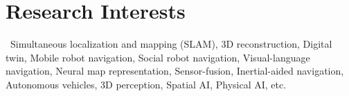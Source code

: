 \section{Research Interests}

\ Simultaneous localization and mapping (SLAM), 3D reconstruction, Digital twin, Mobile robot navigation, Social robot navigation, Visual-language navigation, Neural map representation, Sensor-fusion, Inertial-aided navigation, Autonomous vehicles, 3D perception, Spatial AI, Physical AI, etc.
